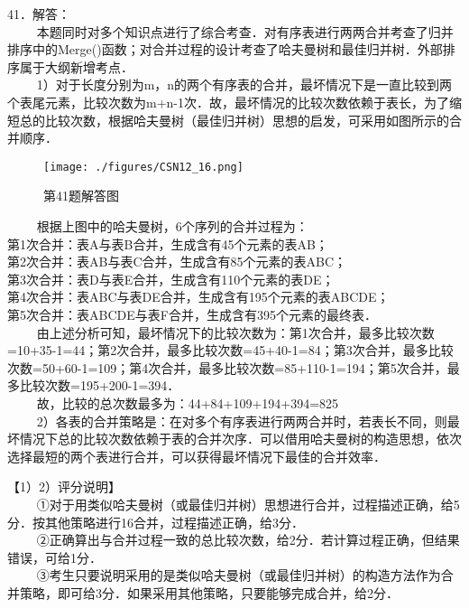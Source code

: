 41．解答：\\
$\qquad$ 本题同时对多个知识点进行了综合考查．对有序表进行两两合并考查了归并排序中的Merge()函数；对合并过程的设计考查了哈夫曼树和最佳归并树．外部排序属于大纲新增考点．\\
$\qquad$ 1）对于长度分别为m，n的两个有序表的合并，最坏情况下是一直比较到两个表尾元素，比较次数为m+n-1次．故，最坏情况的比较次数依赖于表长，为了缩短总的比较次数，根据哈夫曼树（最佳归并树）思想的启发，可采用如图所示的合并顺序．
\begin{figure}[ht]
\centering
\texttt{[image: ./figures/CSN12\_16.png]}
\caption{第41题解答图} \label{CSN12_fig16}
\end{figure}
$\qquad$ 根据上图中的哈夫曼树，6个序列的合并过程为：\\
第1次合并：表A与表B合并，生成含有45个元素的表AB；\\
第2次合并：表AB与表C合并，生成含有85个元素的表ABC；\\
第3次合并：表D与表E合并，生成含有110个元素的表DE；\\
第4次合并：表ABC与表DE合并，生成含有195个元素的表ABCDE；\\
第5次合并：表ABCDE与表F合并，生成含有395个元素的最终表．\\
$\qquad$ 由上述分析可知，最坏情况下的比较次数为：第1次合并，最多比较次数=10+35-1=44；第2次合并，最多比较次数=45+40-1=84；第3次合并，最多比较次数=50+60-1=109；第4次合并，最多比较次数=85+110-1=194；第5次合并，最多比较次数=195+200-1=394．\\
$\qquad$ 故，比较的总次数最多为：44+84+109+194+394=825 \\
$\qquad$ 2）各表的合并策略是：在对多个有序表进行两两合并时，若表长不同，则最坏情况下总的比较次数依赖于表的合并次序．可以借用哈夫曼树的构造思想，依次选择最短的两个表进行合并，可以获得最坏情况下最佳的合并效率．

【1）2）评分说明】\\
$\qquad$ ①对于用类似哈夫曼树（或最佳归并树）思想进行合并，过程描述正确，给5分．按其他策略进行16合并，过程描述正确，给3分．\\
$\qquad$ ②正确算出与合并过程一致的总比较次数，给2分．若计算过程正确，但结果错误，可给1分．\\
$\qquad$ ③考生只要说明采用的是类似哈夫曼树（或最佳归并树）的构造方法作为合并策略，即可给3分．如果采用其他策略，只要能够完成合并，给2分．


